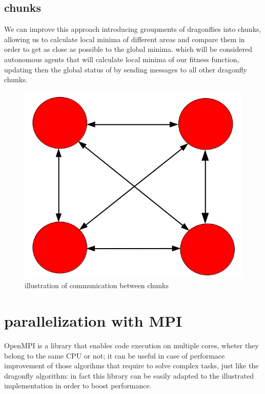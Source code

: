 \documentclass[10pt]{article}
\begin{document}
\begin{multicols}{2}
\subsection*{chunks}
We can improve this approach introducing groupments of dragonflies into chunks, 
allowing us to calculate local minima of different areas and compare them in order
to get as close as possible to the global minima. which will be considered
autonomous agents that will calculate local minima of our fitness function, updating then the 
global status of by sending messages to all other dragonfly chunks. 

\begin{figure}[H]
  \includegraphics[scale=0.3]{chunks.png}
  \caption{illustration of communication between chunks}
\end{figure}

\section{parallelization with MPI}

OpenMPI is a library that enables code execution on multiple cores, wheter they belong
to the same CPU or not; it can be useful in case of performace improvement of those algorihms
that require to solve complex tasks, just like the dragonfly algorithm: in fact this library can be easily 
adapted to the illustrated implementation in order to boost performance.


\end{multicols}
\end{document}
